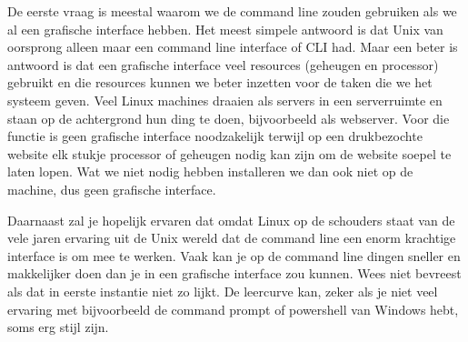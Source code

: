 De eerste vraag is meestal waarom we de command line zouden gebruiken als we al een grafische interface hebben. Het
meest simpele antwoord is dat Unix van oorsprong alleen maar een command line interface of CLI had. Maar een beter is
antwoord is dat een grafische interface veel resources (geheugen en processor) gebruikt en die resources kunnen we
beter inzetten voor de taken die we het systeem geven. Veel Linux machines draaien als servers in een serverruimte en
staan op de achtergrond hun ding te doen, bijvoorbeeld als webserver. Voor die functie is geen grafische interface
noodzakelijk terwijl op een drukbezochte website elk stukje processor of geheugen nodig kan zijn om de website soepel
te laten lopen. Wat we niet nodig hebben installeren we dan ook niet op de machine, dus geen grafische interface.

Daarnaast zal je hopelijk ervaren dat omdat Linux op de schouders staat van de vele jaren ervaring uit de Unix wereld
dat de command line een enorm krachtige interface is om mee te werken. Vaak kan je op de command line dingen sneller en
makkelijker doen dan je in een grafische interface zou kunnen. Wees niet bevreest als dat in eerste instantie niet zo
lijkt. De leercurve kan, zeker als je niet veel ervaring met bijvoorbeeld de command prompt of powershell van Windows
hebt, soms erg stijl zijn.

